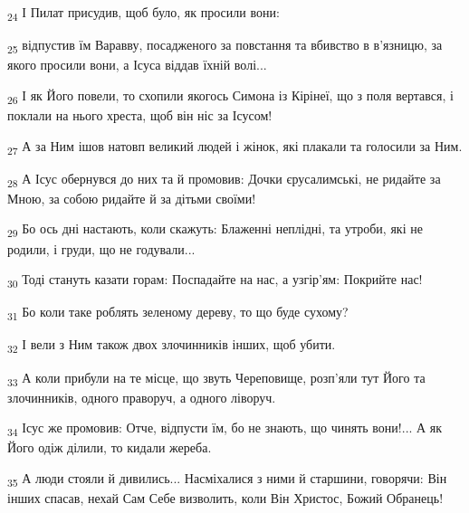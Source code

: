 \begin{tcolorbox}
\textsubscript{24} І Пилат присудив, щоб було, як просили вони:
\end{tcolorbox}
\begin{tcolorbox}
\textsubscript{25} відпустив їм Варавву, посадженого за повстання та вбивство в в'язницю, за якого просили вони, а Ісуса віддав їхній волі...
\end{tcolorbox}
\begin{tcolorbox}
\textsubscript{26} І як Його повели, то схопили якогось Симона із Кірінеї, що з поля вертався, і поклали на нього хреста, щоб він ніс за Ісусом!
\end{tcolorbox}
\begin{tcolorbox}
\textsubscript{27} А за Ним ішов натовп великий людей і жінок, які плакали та голосили за Ним.
\end{tcolorbox}
\begin{tcolorbox}
\textsubscript{28} А Ісус обернувся до них та й промовив: Дочки єрусалимські, не ридайте за Мною, за собою ридайте й за дітьми своїми!
\end{tcolorbox}
\begin{tcolorbox}
\textsubscript{29} Бо ось дні настають, коли скажуть: Блаженні неплідні, та утроби, які не родили, і груди, що не годували...
\end{tcolorbox}
\begin{tcolorbox}
\textsubscript{30} Тоді стануть казати горам: Поспадайте на нас, а узгір'ям: Покрийте нас!
\end{tcolorbox}
\begin{tcolorbox}
\textsubscript{31} Бо коли таке роблять зеленому дереву, то що буде сухому?
\end{tcolorbox}
\begin{tcolorbox}
\textsubscript{32} І вели з Ним також двох злочинників інших, щоб убити.
\end{tcolorbox}
\begin{tcolorbox}
\textsubscript{33} А коли прибули на те місце, що звуть Череповище, розп'яли тут Його та злочинників, одного праворуч, а одного ліворуч.
\end{tcolorbox}
\begin{tcolorbox}
\textsubscript{34} Ісус же промовив: Отче, відпусти їм, бо не знають, що чинять вони!... А як Його одіж ділили, то кидали жереба.
\end{tcolorbox}
\begin{tcolorbox}
\textsubscript{35} А люди стояли й дивились... Насміхалися з ними й старшини, говорячи: Він інших спасав, нехай Сам Себе визволить, коли Він Христос, Божий Обранець!
\end{tcolorbox}
